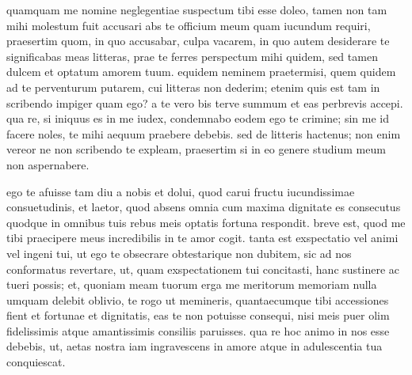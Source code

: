 


 quamquam me nomine neglegentiae suspectum tibi esse doleo, tamen non tam mihi molestum fuit accusari abs te officium meum quam iucundum requiri, praesertim quom, in quo accusabar, culpa vacarem, in quo autem desiderare te significabas meas litteras, prae te ferres perspectum mihi quidem, sed tamen dulcem et optatum amorem tuum. equidem neminem praetermisi, quem quidem ad te perventurum putarem, cui litteras non dederim; etenim quis est tam in scribendo impiger quam ego? a te vero bis terve summum et eas perbrevis accepi. qua re, si iniquus es in me iudex, condemnabo eodem ego te crimine; sin me id facere noles, te mihi aequum praebere debebis. sed de litteris hactenus; non enim vereor ne non scribendo te expleam, praesertim si in eo genere studium meum non aspernabere.

 ego te afuisse tam diu a nobis et dolui, quod carui fructu iucundissimae consuetudinis, et laetor, quod absens omnia cum maxima dignitate es consecutus quodque in omnibus tuis rebus meis optatis fortuna respondit. breve est, quod me tibi praecipere meus incredibilis in te amor cogit. tanta est exspectatio vel animi vel ingeni tui, ut ego te obsecrare obtestarique non dubitem, sic ad nos conformatus revertare, ut, quam exspectationem tui concitasti, hanc sustinere ac tueri possis; et, quoniam meam tuorum erga me meritorum memoriam nulla umquam delebit oblivio, te rogo ut memineris, quantaecumque tibi accessiones fient et fortunae et dignitatis, eas te non potuisse consequi, nisi meis puer olim fidelissimis atque amantissimis consiliis paruisses. qua re hoc animo in nos esse debebis, ut, aetas nostra iam ingravescens in amore atque in adulescentia tua conquiescat.
